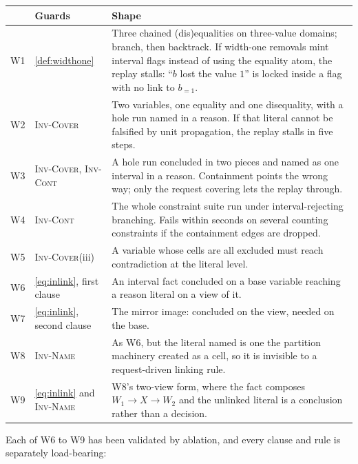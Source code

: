 \documentclass[11pt,a4paper]{article}
\theoremstyle{plain}
\theoremstyle{definition}
\theoremstyle{remark}
\newcommand{\ateq}[2]{#1_{= #2}}
\newcommand{\inv}[1]{\textnormal{\textsc{Inv-#1}}}
\newcommand{\invCover}{\inv{Cover}}
\newcommand{\invCont}{\inv{Cont}}
\newcommand{\invName}{\inv{Name}}
\begin{document}
\begin{center}
\small
\begin{tabular}{@{}llp{7.1cm}@{}}
\toprule
& \textbf{Guards} & \textbf{Shape} \\
\midrule
W1 & \cref{def:widthone} & Three chained (dis)equalities on three-value domains;
  branch, then backtrack.  If width-one removals mint interval flags instead of
  using the equality atom, the replay stalls: ``$b$ lost the value $1$'' is
  locked inside a flag with no link to $\ateq{b}{1}$. \\
W2 & \invCover{} & Two variables, one equality and one disequality, with a hole
  run named in a reason.  If that literal cannot be falsified by unit
  propagation, the replay stalls in five steps. \\
W3 & \invCover{}, \invCont{} & A hole run concluded in two pieces and named as
  one interval in a reason.  Containment points the wrong way; only the request
  covering lets the replay through. \\
W4 & \invCont{} & The whole constraint suite run under interval-rejecting
  branching.  Fails within seconds on several counting constraints if the
  containment edges are dropped. \\
W5 & \invCover{}(iii) & A variable whose cells are all excluded must reach
  contradiction at the literal level. \\
W6 & \cref{eq:inlink}, first clause & An interval fact concluded on a base
  variable reaching a reason literal on a view of it. \\
W7 & \cref{eq:inlink}, second clause & The mirror image: concluded on the view,
  needed on the base. \\
W8 & \invName{} & As W6, but the literal named is one the partition machinery
  created as a cell, so it is invisible to a request-driven linking rule. \\
W9 & \cref{eq:inlink} and \invName{} & W8's two-view form, where the fact
  composes $W_1\to X\to W_2$ and the unlinked literal is a conclusion rather
  than a decision. \\
\bottomrule
\end{tabular}
\end{center}

Each of W6 to W9 has been validated by ablation, and every clause and rule is
separately load-bearing:
\end{document}

